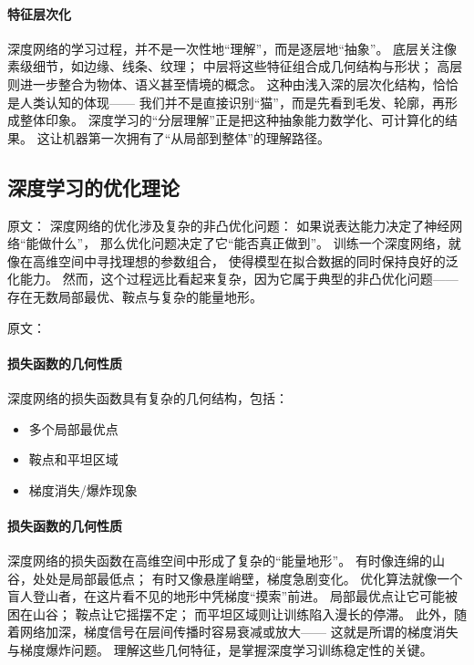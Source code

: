 \paragraph{特征层次化}  
深度网络的学习过程，并不是一次性地“理解”，而是逐层地“抽象”。  
底层关注像素级细节，如边缘、线条、纹理；  
中层将这些特征组合成几何结构与形状；  
高层则进一步整合为物体、语义甚至情境的概念。  
这种由浅入深的层次化结构，恰恰是人类认知的体现——  
我们并不是直接识别“猫”，而是先看到毛发、轮廓，再形成整体印象。  
深度学习的“分层理解”正是把这种抽象能力数学化、可计算化的结果。  
这让机器第一次拥有了“从局部到整体”的理解路径。


\subsection{深度学习的优化理论}

原文：
深度网络的优化涉及复杂的非凸优化问题：
如果说表达能力决定了神经网络“能做什么”，  
那么优化问题决定了它“能否真正做到”。  
训练一个深度网络，就像在高维空间中寻找理想的参数组合，  
使得模型在拟合数据的同时保持良好的泛化能力。  
然而，这个过程远比看起来复杂，因为它属于典型的非凸优化问题——  
存在无数局部最优、鞍点与复杂的能量地形。

原文：
\paragraph{损失函数的几何性质}
深度网络的损失函数具有复杂的几何结构，包括：
\begin{itemize}
\item 多个局部最优点
\item 鞍点和平坦区域
\item 梯度消失/爆炸现象
\end{itemize}
\paragraph{损失函数的几何性质}  
深度网络的损失函数在高维空间中形成了复杂的“能量地形”。  
有时像连绵的山谷，处处是局部最低点；  
有时又像悬崖峭壁，梯度急剧变化。  
优化算法就像一个盲人登山者，在这片看不见的地形中凭梯度“摸索”前进。  
局部最优点让它可能被困在山谷；  
鞍点让它摇摆不定；  
而平坦区域则让训练陷入漫长的停滞。  
此外，随着网络加深，梯度信号在层间传播时容易衰减或放大——  
这就是所谓的梯度消失与梯度爆炸问题。  
理解这些几何特征，是掌握深度学习训练稳定性的关键。

